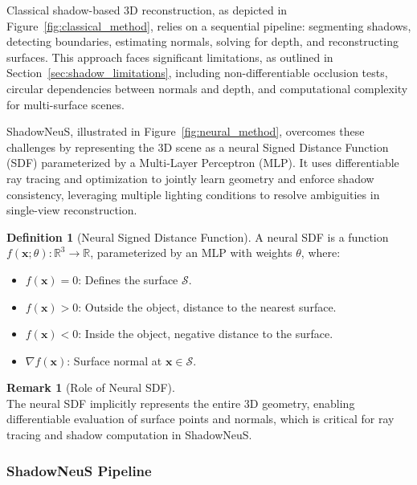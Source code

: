 \documentclass[12pt]{article}
\theoremstyle{definition}
\newtheorem{definition}{Definition}[subsection]
\newtheorem{remark}{Remark}[subsection]
\begin{document}
Classical shadow-based 3D reconstruction, as depicted in Figure~\ref{fig:classical_method}, relies on a sequential pipeline: segmenting shadows, detecting boundaries, estimating normals, solving for depth, and reconstructing surfaces. This approach faces significant limitations, as outlined in Section~\ref{sec:shadow_limitations}, including non-differentiable occlusion tests, circular dependencies between normals and depth, and computational complexity for multi-surface scenes.

ShadowNeuS, illustrated in Figure~\ref{fig:neural_method}, overcomes these challenges by representing the 3D scene as a neural Signed Distance Function (SDF) parameterized by a Multi-Layer Perceptron (MLP). It uses differentiable ray tracing and optimization to jointly learn geometry and enforce shadow consistency, leveraging multiple lighting conditions to resolve ambiguities in single-view reconstruction.

\begin{definition}[Neural Signed Distance Function] \label{def:neural_sdf}
A neural SDF is a function \(f(\mathbf{x}; \theta): \mathbb{R}^3 \to \mathbb{R}\), parameterized by an MLP with weights \(\theta\), where:
\begin{itemize}
    \item \(f(\mathbf{x}) = 0\): Defines the surface \(\mathcal{S}\).
    \item \(f(\mathbf{x}) > 0\): Outside the object, distance to the nearest surface.
    \item \(f(\mathbf{x}) < 0\): Inside the object, negative distance to the surface.
    \item \(\nabla f(\mathbf{x})\): Surface normal at \(\mathbf{x} \in \mathcal{S}\).
\end{itemize}
\end{definition}

\begin{remark}[Role of Neural SDF] ~\\
The neural SDF implicitly represents the entire 3D geometry, enabling differentiable evaluation of surface points and normals, which is critical for ray tracing and shadow computation in ShadowNeuS.
\end{remark}

\subsubsection{ShadowNeuS Pipeline} \label{sec:shadowneus_pipeline}
\end{document}

